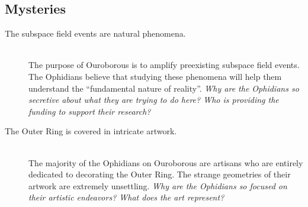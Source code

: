 \documentclass[11pt, a5paper, parskip=half-, DIV=12]{scrartcl}
\begin{document}
\subsection*{Mysteries}
\begin{description}
	\item[The subspace field events are natural phenomena.] \phantom{} \\ The purpose of Ouroborous is to amplify preexisting subspace field events. The Ophidians believe that studying these phenomena will help them understand the ``fundamental nature of reality''. \textit{Why are the Ophidians so secretive about what they are trying to do here? Who is providing the funding to support their research?}
	\item[The Outer Ring is covered in intricate artwork.] \phantom{a} \\ The majority of the Ophidians on Ouroborous are artisans who are entirely dedicated to decorating the Outer Ring. The strange geometries of their artwork are extremely unsettling. \textit{Why are the Ophidians so focused on their artistic endeavors? What does the art represent?}
\end{description}

\newpage



\newpage

\thispagestyle{empty}
\end{document}
